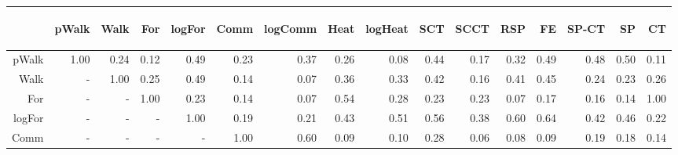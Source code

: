 \documentclass{article}
\begin{document}
\begin{table}[H]{\small
	\centering
	\begin{tabular}{r|rrrrrrrrrrrrrrr}
 & \begin{rotate}{60} pWalk \end{rotate} &
\begin{rotate}{60} Walk \end{rotate} &
\begin{rotate}{60} For \end{rotate} &
\begin{rotate}{60} logFor \end{rotate} &
\begin{rotate}{60} Comm \end{rotate} &
\begin{rotate}{60} logComm \end{rotate} &
\begin{rotate}{60} Heat \end{rotate} &
\begin{rotate}{60} logHeat \end{rotate} &
\begin{rotate}{60} SCT \end{rotate} &
\begin{rotate}{60} SCCT \end{rotate} &
\begin{rotate}{60} RSP \end{rotate} &
\begin{rotate}{60} FE \end{rotate} &
\begin{rotate}{60} SP-CT \end{rotate} &
\begin{rotate}{60} SP \end{rotate} &
\begin{rotate}{60} CT \end{rotate} \\
		\midrule
pWalk & 1.00 & 0.24 & 0.12 & 0.49 & 0.23 & 0.37 & 0.26 & 0.08 & 0.44 & 0.17 & 0.32 & 0.49 & 0.48 & 0.50 & 0.11\\
Walk & - & 1.00 & 0.25 & 0.49 & 0.14 & 0.07 & 0.36 & 0.33 & 0.42 & 0.16 & 0.41 & 0.45 & 0.24 & 0.23 & 0.26\\
For & - & - & 1.00 & 0.23 & 0.14 & 0.07 & 0.54 & 0.28 & 0.23 & 0.23 & 0.07 & 0.17 & 0.16 & 0.14 & 1.00\\
logFor & - & - & - & 1.00 & 0.19 & 0.21 & 0.43 & 0.51 & 0.56 & 0.38 & 0.60 & 0.64 & 0.42 & 0.46 & 0.22\\
Comm & - & - & - & - & 1.00 & 0.60 & 0.09 & 0.10 & 0.28 & 0.06 & 0.08 & 0.09 & 0.19 & 0.18 & 0.14\\

\end{tabular}}
\end{table}
\end{document}
